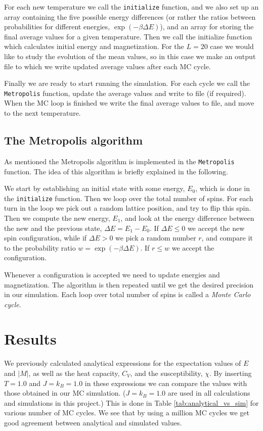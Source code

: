 \documentclass[12pt, a4paper]{article}
\begin{document}
For each new temperature we call the \texttt{initialize} function, and we also set up an array 
containing the five possible energy differences (or rather the 
ratios between probabilities for different energies, $\exp(-\beta\Delta E)$), and an array for 
storing the final average values for a given temperature. Then we call the initialize function which 
calculates initial energy and magnetization. 
For the $L = 20$ case we would like to study the evolution of the mean values, so in this case we make 
an output file to which we write updated average values after each MC cycle.

Finally we are ready to start running the simulation. For each cycle we call the  
\texttt{Metropolis} function, update the average values and write to file (if required). When the 
MC loop is finished we write the final average values to file, and move to the next temperature.  
  
\subsection{The Metropolis algorithm}

As mentioned the Metropolis algorithm \cite{Metropolis} is implemented in the \texttt{Metropolis} 
function. The idea of this algorithm is briefly explained in the following. 

We start by establishing an initial state with some energy, $E_0$, which is done in the 
\texttt{initialize} function. Then we loop over the total number of spins. For each turn in the loop 
we pick out a random lattice position, and try to flip this spin. Then we compute the new energy, $E_1$, 
and look at the energy difference between the new and the previous state, $\Delta E = E_1 - E_0$. 
If $\Delta E\leq 0$ we accept the new spin configuration, while if $\Delta E > 0$ we pick a random 
number $r$, and compare it to the probability ratio $w=\exp(-\beta\Delta E)$. If $r\leq w$ we 
accept the configuration. 

Whenever a configuration is accepted we need to update energies and magnetization. The algorithm is 
then repeated until we get the desired precision in our simulation. Each loop over total number of spins 
is called a \textit{Monte Carlo cycle}.     

\section{Results}

We previously calculated analytical expressions for the expectation values of $E$ and $|M|$, as well as 
the heat capacity, $C_V$, and the susceptibility, $\chi$. By inserting $T = 1.0$ and $J=k_B = 1.0$ 
in these expressions we can compare the values with those obtained in our MC simulation. ($J=k_B = 1.0$ 
are used in all calculations and simulations in this project.) This is done in 
Table \ref{tab:analytical_vs_sim} for various number of MC cycles. We see that by using a million 
MC cycles we get good agreement between analytical and simulated values. 
\end{document}
